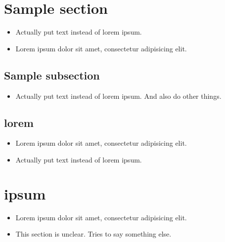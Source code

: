 \section{Sample section}
\label{autosec:1}
    \begin{itemize}[noitemsep]
        \item {\color{red}Actually put text instead of lorem ipsum.}
        \item Lorem ipsum dolor sit amet, consectetur adipisicing elit.
    \end{itemize}
\subsection{Sample subsection}
\label{autosec:2}
    \begin{itemize}[noitemsep]
        \item {\color{red}Actually put text instead of lorem ipsum.}
{\color{red}And also do other things.}
    \end{itemize}
\subsection{lorem}
\label{autosec:3}
    \begin{itemize}[noitemsep]
        \item Lorem ipsum dolor sit amet, consectetur adipisicing elit.
        \item {\color{red}Actually put text instead of lorem ipsum.}
    \end{itemize}
\section{ipsum}
\label{autosec:4}
    \begin{itemize}[noitemsep]
        \item Lorem ipsum dolor sit amet, consectetur adipisicing elit.
        \item {\color{OliveGreen}This section is unclear.}
{\color{OliveGreen}Tries to say something else.}
    \end{itemize}
